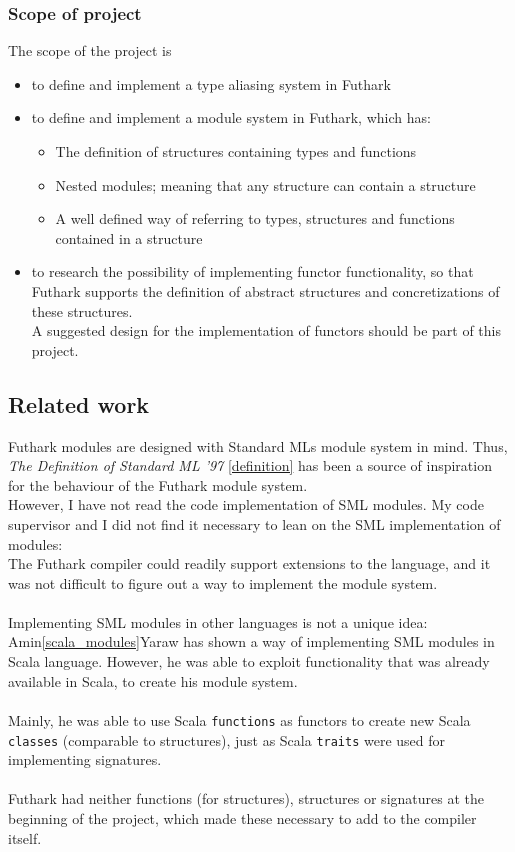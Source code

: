\subsubsection{Scope of project}
\label{subsec:project_scope}
The scope of the project is
\begin{itemize}
  \item to define and implement a type aliasing system in Futhark
  \item to define and implement a module system in Futhark, which has:
    \begin{itemize}
      \item The definition of structures containing types and functions
      \item Nested modules; meaning that any structure can contain a structure
      \item A well defined way of referring to types, structures and functions
        contained in a structure
    \end{itemize}
  \item to research the possibility of implementing functor functionality, so that Futhark supports the
    definition of abstract structures and concretizations of these structures.
    \\    A suggested design for the implementation of functors should be part of this project.
\end{itemize}
\clearpage

\subsection{Related work}
Futhark modules are designed with Standard MLs module system in mind. Thus, \textit{The
Definition of Standard ML '97} \ref{definition} has been a source of inspiration
for the behaviour of the Futhark module system. \\
However, I have not read the code implementation of SML modules. My code supervisor and I did not find it necessary to lean on the SML implementation of modules:\\
The Futhark compiler could readily support extensions to the language, and it was not difficult to
figure out a way to implement the module system.
\\
\\
Implementing SML modules in other languages is not a unique idea:\\
Amin\ref{scala_modules}Yaraw has shown a way of implementing SML modules in Scala
language. However, he was able to exploit functionality that was already available in
Scala, to create his module system.
\\
\\
Mainly, he was able to use Scala \texttt{functions} as functors to create new Scala
\texttt{classes} (comparable to structures), just as Scala
\texttt{traits} were used for implementing signatures.
\\
\\
Futhark had neither functions (for structures), structures or signatures at the
beginning of the project, which made these necessary to add to the compiler itself.